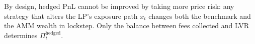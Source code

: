 \documentclass[11pt]{article}
\begin{document}
By design, hedged PnL cannot be improved by taking more price risk: any strategy that alters
the LP's exposure path $x_t$ changes both the benchmark and the AMM wealth in lockstep.
Only the balance between fees collected and LVR determines $\Pi_t^{\mathrm{hedged}}$.




\end{document}
